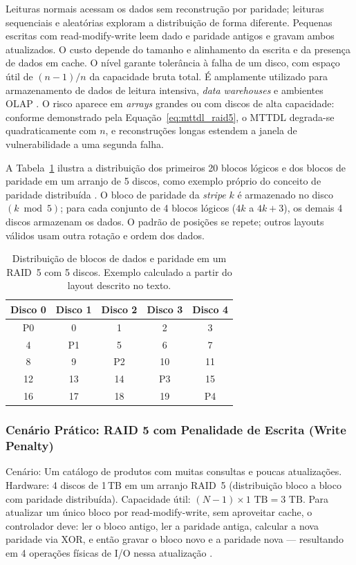 \documentclass[titlepage]{article}
\begin{document}
Leituras normais acessam os dados sem reconstrução por paridade; leituras sequenciais e aleatórias exploram a distribuição de forma diferente. Pequenas escritas com read-modify-write leem dado e paridade antigos e gravam ambos atualizados. O custo depende do tamanho e alinhamento da escrita e da presença de dados em cache. O nível garante tolerância à falha de um disco, com espaço útil de $(n-1)/n$ da capacidade bruta total. É amplamente utilizado para armazenamento de dados de leitura intensiva, \textit{data warehouses} e ambientes OLAP \cite{silberschatz2020}. O risco aparece em \textit{arrays} grandes ou com discos de alta capacidade: conforme demonstrado pela Equação~\ref{eq:mttdl_raid5}, o MTTDL degrada-se quadraticamente com $n$, e reconstruções longas estendem a janela de vulnerabilidade a uma segunda falha.

A Tabela~\ref{tab:raid5_blocos} ilustra a distribuição dos primeiros 20 blocos lógicos e dos blocos de paridade em um arranjo de 5 discos, como exemplo próprio do conceito de paridade distribuída \cite{silberschatz2020}. O bloco de paridade da \textit{stripe} $k$ é armazenado no disco $(k \bmod 5)$; para cada conjunto de 4 blocos lógicos ($4k$ a $4k+3$), os demais 4 discos armazenam os dados. O padrão de posições se repete; outros layouts válidos usam outra rotação e ordem dos dados.

\begin{table}[H]
    \centering
    \footnotesize
    \renewcommand{\arraystretch}{1.4}
    \begin{tabular}{|c|c|c|c|c|}
        \hline
        \textbf{Disco 0} & \textbf{Disco 1} & \textbf{Disco 2} & \textbf{Disco 3} & \textbf{Disco 4} \\
        \hline
        P0 & 0 & 1 & 2 & 3 \\
        4 & P1 & 5 & 6 & 7 \\
        8 & 9 & P2 & 10 & 11 \\
        12 & 13 & 14 & P3 & 15 \\
        16 & 17 & 18 & 19 & P4 \\
        \hline
    \end{tabular}
    \caption{Distribuição de blocos de dados e paridade em um RAID~5 com 5 discos. Exemplo calculado a partir do layout descrito no texto.}
    \label{tab:raid5_blocos}
\end{table}

\subsubsection{Cenário Prático: RAID 5 com Penalidade de Escrita (Write Penalty)}
\label{sec:cenario_raid5_penalty}
Cenário: Um catálogo de produtos com muitas consultas e poucas atualizações. Hardware: 4 discos de 1\,TB em um arranjo RAID~5 (distribuição bloco a bloco com paridade distribuída).
Capacidade útil: $(N - 1) \times 1\text{ TB} = 3\text{ TB}$.
Para atualizar um único bloco por read-modify-write, sem aproveitar cache, o controlador deve: ler o bloco antigo, ler a paridade antiga, calcular a nova paridade via XOR, e então gravar o bloco novo e a paridade nova --- resultando em 4 operações físicas de I/O nessa atualização \cite{raid5_io}.
\end{document}
